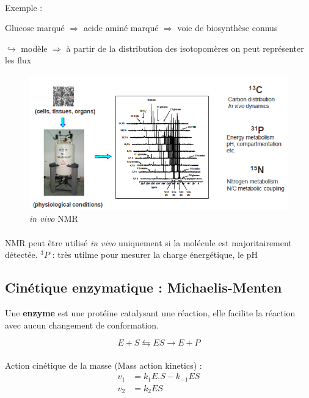 \paragraph{} Exemple :

Glucose marqué $\Rightarrow$ acide aminé marqué $\Rightarrow$ voie de biosynthèse connus

$\hookrightarrow$ modèle $\Rightarrow$ à partir de la distribution des isotopomères on peut représenter les flux



\begin{figure}[!ht]
    \centering
    \includegraphics{Images/10.PNG}
    \caption{\textit{in vivo} NMR}
\end{figure}

\paragraph{}NMR peut être utilisé \textit{in vivo} uniquement si la molécule est majoritairement détectée.
$^3P$ : très utilme pour mesurer la charge énergétique, le pH


\subsection{Cinétique enzymatique : Michaelis-Menten}

Une \textbf{enzyme} est une protéine catalysant une réaction, elle facilite la réaction avec aucun changement de conformation.

$$E + S  \leftrightarrows ES \rightarrow E + P$$

\paragraph{}Action cinétique de la masse (Mass action kinetics) :
\begin{align*}
v_1 &=k_1E.S - k_{-1}ES\\
v_2 &=k_2ES
\end{align*}

